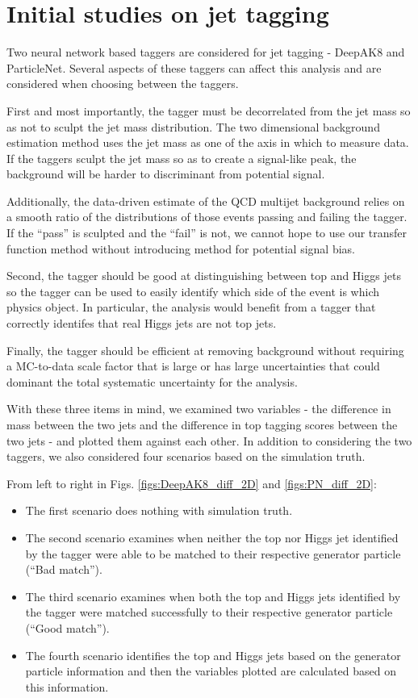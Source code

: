 \documentclass[10pt]{article}
\begin{document}
\section{Initial studies on jet tagging}
\label{sec:jets}
Two neural network based taggers are considered for jet tagging -
DeepAK8 and ParticleNet. Several aspects of these taggers can affect this
analysis and are considered when choosing between the taggers.

First and most importantly, the tagger must be decorrelated from the jet
mass so as not to sculpt the jet mass distribution. The two dimensional background
estimation method uses the jet mass as one of the axis in which to measure data.
If the taggers sculpt the jet mass so as to create a signal-like peak, the background
will be harder to discriminant from potential signal.

Additionally, the data-driven
estimate of the QCD multijet background relies on a smooth ratio of the distributions
of those events passing and failing the tagger. If the ``pass'' is sculpted and the ``fail''
is not, we cannot hope to use our transfer function method without introducing method
for potential signal bias.

Second, the tagger should be good at distinguishing between top and Higgs jets so the
tagger can be used to easily identify which side of the event is which physics object.
In particular, the analysis would benefit from a tagger that correctly identifes that 
real Higgs jets are not top jets.

Finally, the tagger should be efficient at removing background without requiring a 
MC-to-data scale factor that is large or has large uncertainties that could dominant
the total systematic uncertainty for the analysis.

With these three items in mind, we examined two variables - the difference in mass
between the two jets and the difference in top tagging scores between the two jets
- and plotted them against each other. In addition to considering the two taggers,
we also considered four scenarios based on the simulation truth.

From left to right in Figs. \ref{figs:DeepAK8_diff_2D} and \ref{figs:PN_diff_2D}:
\begin{itemize}
    \item The first scenario does nothing with simulation truth.
    \item The second scenario examines when neither the top nor Higgs jet identified by the
          tagger were able to be matched to their respective generator particle (``Bad match'').
    \item The third scenario examines when both the top and Higgs jets identified by the tagger
          were matched successfully to their respective generator particle (``Good match'').
    \item The fourth scenario identifies the top and Higgs jets based on the generator particle
          information and then the variables plotted are calculated based on this information.
\end{itemize}
\end{document}
